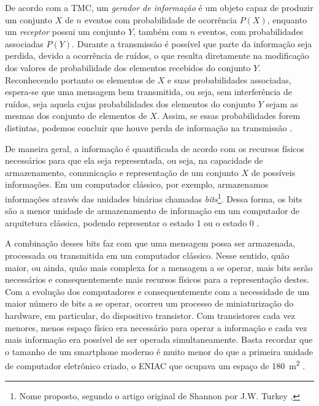 \documentclass[12pt,oneside,brazil,hidelinks,article,sumario=tradicional,a4paper]{abntex2}
\begin{document}
De acordo com  a TMC, um \textit{gerador de informação} é um objeto capaz de produzir um conjunto $X$ de $n$ eventos com probabilidade de ocorrência $P(X)$, enquanto um \textit{receptor} possui um conjunto $Y$, também com $n$ eventos, com probabilidades associadas $P(Y)$. Durante a transmissão é possível que parte da informação seja perdida, devido a ocorrência de ruídos, o que resulta diretamente na modificação dos valores de probabilidade dos elementos recebidos do conjunto $Y$. Reconhecendo portanto os elementos de $X$ e suas probabilidades associadas, espera-se que uma mensagem bem transmitida, ou seja, sem interferência de ruídos, seja aquela cujas probabilidades dos elementos do conjunto $Y$ sejam as mesmas dos conjunto de elementos de $X$. Assim, se essas probabilidades forem distintas, podemos concluir que houve perda de informação na transmissão \cite{mathematical}.

De maneira geral, a informação é quantificada de acordo com os recursos físicos necessários para que ela seja representada, ou seja, na capacidade de armazenamento, comunicação e representação de um conjunto $X$ de possíveis informações. Em um computador clássico, por exemplo, armazenamos informações através das unidades binárias chamadas \textit{bits}\footnote{Nome proposto, segundo o artigo original de Shannon por J.W. Turkey \cite{MTC}.}. Dessa forma, os bits são a menor unidade de armazenamento de informação em um computador de arquitetura clássica, podendo representar o estado 1 ou o estado 0 \cite{MTC}.

A combinação desses bits faz com que uma mensagem possa ser armazenada, processada ou transmitida em um computador clássico. Nesse sentido, quão maior, ou ainda, quão mais complexa for a mensagem a se operar, mais bits serão necessários e consequentemente mais recursos físicos para a representação destes. Com a evolução dos computadores e consequentemente com a necessidade de um maior número de bits a se operar, ocorreu um processo de miniaturização do hardware, em particular, do dispositivo transistor. Com transistores cada vez menores, menos espaço físico era necessário para operar a informação e cada vez mais informação era possível de ser operada simultaneamente. Basta recordar que o tamanho de um smartphone moderno é muito menor do que a primeira unidade de computador eletrônico criado, o ENIAC que ocupava um espaço de \SI{180}{\square\meter} \cite{eniac}.
\end{document}
